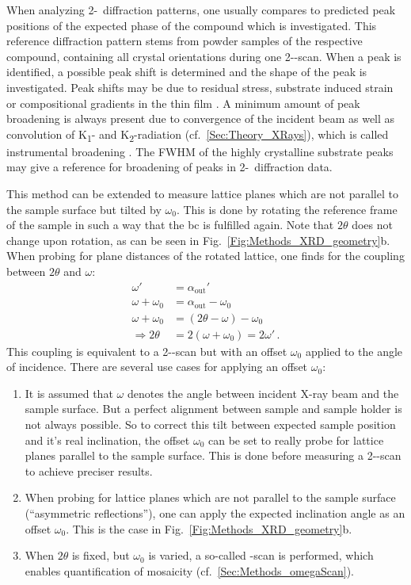 When analyzing 2\texttheta-\textomega\ diffraction patterns, one usually compares to predicted peak positions of the expected phase of the compound which is investigated.
This reference diffraction pattern stems from powder samples of the respective compound, containing all crystal orientations during one 2\texttheta-\textomega-scan.
When a peak is identified, a possible peak shift is determined and the shape of the peak is investigated.
Peak shifts may be due to residual stress, substrate induced strain or compositional gradients in the thin film 
    \cite{harrington2021}.
A minimum amount of peak broadening is always present due to convergence of the incident beam as well as convolution of K\textalpha\textsubscript{1}- and K\textalpha\textsubscript{2}-radiation (cf.~\ref{Sec:Theory_XRays}), which is called instrumental broadening
    \cite{harrington2021}.
The \gls{FWHM} of the highly crystalline substrate peaks may give a reference for broadening of peaks in 2\texttheta-\textomega\ diffraction data.  

This method can be extended to measure lattice planes which are not parallel to the sample surface but tilted by $\omega_0$.
This is done by rotating the reference frame of the sample in such a way that the \gls{bc} is fulfilled again.
Note that $2\theta$ does not change upon rotation, as can be seen in Fig.~\ref{Fig:Methods_XRD_geometry}b.
When probing for plane distances of the rotated lattice, one finds for the coupling between $2\theta$ and $\omega$:
\begin{align*}
    \omega'&=\alpha_\mathrm{out}'\\
    \omega+\omega_0&=\alpha_\mathrm{out}-\omega_0\\
    \omega+\omega_0&=(2\theta-\omega)-\omega_0\\
    \Rightarrow 2\theta&=2(\omega+\omega_0)=2\omega'\,.
\end{align*}
This coupling is equivalent to a 2\texttheta-\textomega-scan but with an offset $\omega_0$ applied to the angle of incidence.
There are several use cases for applying an offset $\omega_0$:
\begin{enumerate}[label=(\roman*)]
    \item It is assumed that $\omega$ denotes the angle between incident X-ray beam and the sample surface.
    But a perfect alignment between sample and sample holder is not always possible.
    So to correct this tilt between expected sample position and it's real inclination, the offset $\omega_0$ can be set to really probe for lattice planes parallel to the sample surface.
    This is done before measuring a 2\texttheta-\textomega-scan to achieve preciser results.
    \item When probing for lattice planes which are not parallel to the sample surface (\enquote{asymmetric reflections}), one can apply the expected inclination angle as an offset $\omega_0$.
    This is the case in Fig.~\ref{Fig:Methods_XRD_geometry}b.
    \item When $2\theta$ is fixed, but $\omega_0$ is varied, a so-called \textomega-scan is performed, which enables quantification of mosaicity (cf.~\ref{Sec:Methods_omegaScan}).
\end{enumerate}

